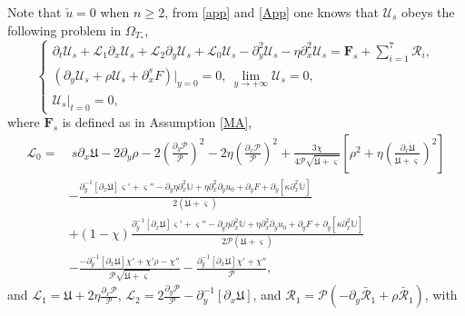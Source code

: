 \documentclass{amsart}
\numberwithin{equation}{section}
\begin{document}
Note that $\check{u}=0$ when $n\ge 2$, from \eqref{app} and \eqref{App} one knows that $\mathcal{U}_{s}$ obeys the following problem in $\Omega_{T_{*}}$,
\begin{equation}\label{us}
\begin{cases}
\partial_{t}\mathcal{U}_{s}
+\mathcal{L}_{1}\partial_{x}\mathcal{U}_{s}
+\mathcal{L}_{2}\partial_{y}\mathcal{U}_{s}
+\mathcal{L}_{0}\mathcal{U}_{s}
-\partial_{y}^{2}\mathcal{U}_{s}-\eta\partial_{x}^{2}\mathcal{U}_{s}
=\mathbf{F}_{s}+\sum\limits_{i=1}^{7}\mathcal{R}_{i},\\
(\partial_{y}\mathcal{U}_{s}+\rho\mathcal{U}_{s}+\partial_{x}^{s}F)|_{y=0}=0,~
\lim\limits_{y\to+\infty} \mathcal{U}_{s}=0,\\
\mathcal{U}_{s}|_{t=0}=0,
\end{cases}
\end{equation}
where $\mathbf{F}_{s}$ is defined as in Assumption \ref{MA},
\begin{align*}
\mathcal{L}_{0}
=&~s\partial_{x}\mathfrak{U}-2\partial_{y}\rho
  -2\left(\frac{\partial_{y}\mathcal{P}}{\mathcal{P}}\right)^{2}-2\eta\left(\frac{\partial_{x}\mathcal{P}}{\mathcal{P}}\right)^{2}
  +\frac{3\chi}{4\mathcal{P}\sqrt{\dot{\mathfrak{U}}+\varsigma}}\left[\rho^{2}+\eta\left(\frac{\partial_{x}\dot{\mathfrak{U}}}{\dot{\mathfrak{U}}+\varsigma}\right)^{2}\right]\\
 &-\frac{\partial_{y}^{-1}\left[\partial_{x}\mathfrak{U}\right]\varsigma'+\varsigma''-\partial_{y}\eta\partial_{x}^{2}\mathbb{U}+\eta\partial_{x}^{2}\partial_{y}u_{0}+\partial_{y}F+\partial_{y}[\kappa\partial_{x}^{2}\mathbb{U}]}{2(\dot{\mathfrak{U}}+\varsigma)}\\
 &+(1-\chi)\frac{\partial_{y}^{-1}\left[\partial_{x}\mathfrak{U}\right]\varsigma'+\varsigma''-\partial_{y}\eta\partial_{x}^{2}\mathbb{U}+\eta\partial_{x}^{2}\partial_{y}u_{0}+\partial_{y}F+\partial_{y}[\kappa\partial_{x}^{2}\mathbb{U}]}{2\mathcal{P}(\dot{\mathfrak{U}}+\varsigma)}\\
 &-\frac{-\partial_{y}^{-1}[\partial_{x}\mathfrak{U}]\chi'+\chi'\rho-\chi''}{\mathcal{P}\sqrt{\dot{\mathfrak{U}}+\varsigma}}
  -\frac{\partial_{y}^{-1}\left[\partial_{x}\mathfrak{U}\right]\chi'+\chi''}{\mathcal{P}},
\end{align*}
and $\mathcal{L}_{1}=\mathfrak{U}+2\eta\frac{\partial_{x}\mathcal{P}}{\mathcal{P}}$,
$\mathcal{L}_{2}=2\frac{\partial_{y}\mathcal{P}}{\mathcal{P}}-\partial_{y}^{-1}\left[\partial_{x}\mathfrak{U}\right]$,
and $\mathcal{R}_{1}=\mathcal{P}(-\partial_{y}\bar{\mathcal{R}}_{1}+\rho \bar{\mathcal{R}}_{1})$, with
\end{document}

